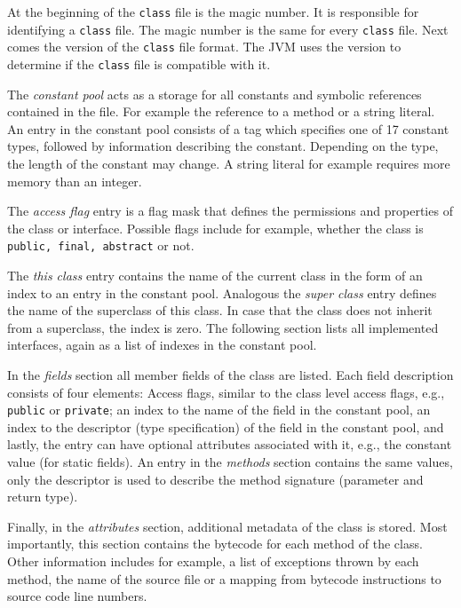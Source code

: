 At the beginning of the \texttt{class} file is the magic number. It is responsible for identifying a \texttt{class} file. The magic number is the same for every \texttt{class} file. Next comes the version of the \texttt{class} file format. The JVM uses the version to determine if the \texttt{class} file is compatible with it.

The \textit{constant pool} acts as a storage for all constants and symbolic references contained in the file. For example the reference to a method or a string literal. An entry in the constant pool consists of a tag which specifies one of 17 constant types, followed by information describing the constant. Depending on the type, the length of the constant may change. A string literal for example requires more memory than an integer. 

The \textit{access flag} entry is a flag mask that defines the permissions and properties of the class or interface. Possible flags include for example, whether the class is \texttt{public, final, abstract} or not. 

The \textit{this class} entry contains the name of the current class in the form of an index to an entry in the constant pool. Analogous the \textit{super class} entry defines the name of the superclass of this class. In case that the class does not inherit from a superclass, the index is zero. The following section lists all implemented interfaces, again as a list of indexes in the constant pool. 

In the \textit{fields} section all member fields of the class are listed. Each field description consists of four elements: Access flags, similar to the class level access flags, e.g., \texttt{public} or \texttt{private}; an index to the name of the field in the constant pool, an index to the descriptor (type specification) of the field in the constant pool, and lastly, the entry can have optional attributes associated with it, e.g., the constant value (for static fields). An entry in the \textit{methods} section contains the same values, only the descriptor is used to describe the method signature (parameter and return type).

Finally, in the \textit{attributes} section, additional metadata of the class is stored. Most importantly, this section contains the bytecode for each method of the class. Other information includes for example, a list of exceptions thrown by each method, the name of the source file or a mapping from bytecode instructions to source code line numbers.

